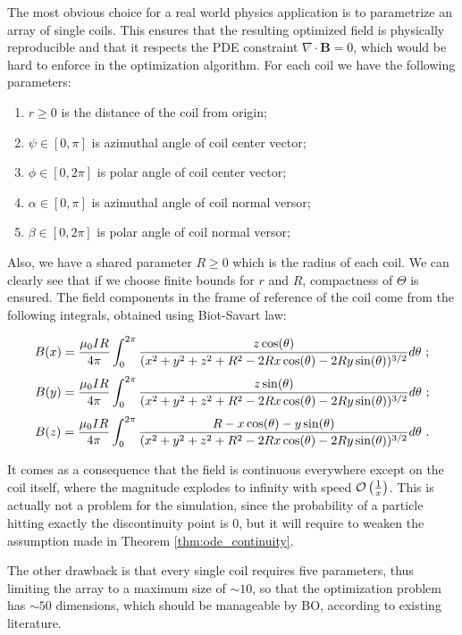 \documentclass{article}
\begin{document}
	The most obvious choice for a real world physics application is to parametrize an array of single coils. This ensures that the resulting optimized field is physically reproducible and that it respects the PDE constraint $\nabla \cdot \mathbf{B} = 0$, which would be hard to enforce in the optimization algorithm. For each coil we have the following parameters:
	
	\begin{enumerate}
		\item $r \geq 0$ is the distance of the coil from origin;
		\item $\psi \in [0, \pi]$ is azimuthal angle of coil center vector;
		\item $\phi \in [0, 2 \pi]$ is polar angle of coil center vector;
		\item $\alpha \in [0, \pi]$ is azimuthal angle of coil normal versor;
		\item $\beta \in [0, 2 \pi]$ is polar angle of coil normal versor;
	\end{enumerate}
	
	Also, we have a shared parameter $R \geq 0$ which is the radius of each coil. We can clearly see that if we choose finite bounds for $r$ and $R$, compactness of $\Theta$ is ensured. The field components in the frame of reference of the coil come from the following integrals, obtained using Biot-Savart law:
	
	$$B(x) = {\mu_0 I R \over 4 \pi} \int_0^{2 \pi} {z \cos(\theta) \over (x^2 + y^2 + z^2 + R^2 -2Rx \cos(\theta) - 2Ry \sin(\theta))^{3/2}} d \theta \ ;$$
	$$B(y) = {\mu_0 I R \over 4 \pi} \int_0^{2 \pi} {z \sin(\theta) \over (x^2 + y^2 + z^2 + R^2 -2Rx \cos(\theta) - 2Ry \sin(\theta))^{3/2}} d \theta \ ;$$
	$$B(z) = {\mu_0 I R \over 4 \pi} \int_0^{2 \pi} {R - x\cos(\theta) - y \sin(\theta) \over (x^2 + y^2 + z^2 + R^2 -2Rx \cos(\theta) - 2Ry \sin(\theta))^{3/2}} d \theta \ .$$
	
	It comes as a consequence that the field is continuous everywhere except on the coil itself, where the magnitude explodes to infinity with speed $\mathcal{O} \left( {1 \over x} \right)$. This is actually not a problem for the simulation, since the probability of a particle hitting exactly the discontinuity point is 0, but it will require to weaken the assumption made in Theorem \ref{thm:ode_continuity}.
	
	The other drawback is that every single coil requires five parameters, thus limiting the array to a maximum size of $\sim 10$, so that the optimization problem has $\sim 50$ dimensions, which should be manageable by BO, according to existing literature.
	
\end{document}
